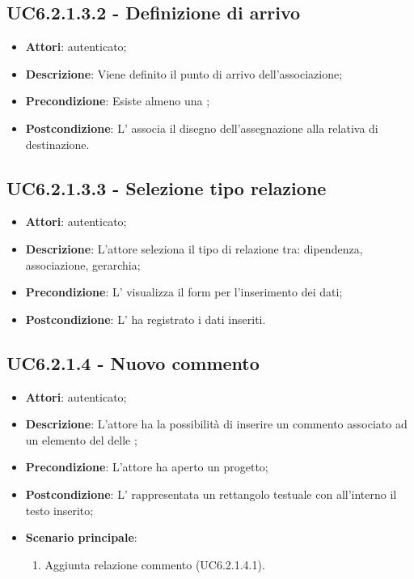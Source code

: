 \subsection{UC6.2.1.3.2 - Definizione  di arrivo}
\label{ssec:UC6.2.1.3.2}
\begin{itemize}
\item \textbf{Attori}:  autenticato;
\item \textbf{Descrizione}: Viene definito il punto di arrivo dell'associazione;
\item \textbf{Precondizione}: Esiste almeno una ;
\item \textbf{Postcondizione}: L' associa il disegno dell'assegnazione alla relativa  di destinazione.
\end{itemize}
\subsection{UC6.2.1.3.3 - Selezione tipo relazione}
\label{ssec:UC6.2.1.3.3}
\begin{itemize}
\item \textbf{Attori}:  autenticato;
\item \textbf{Descrizione}: L'attore seleziona il tipo di relazione tra: dipendenza, associazione, gerarchia;
\item \textbf{Precondizione}: L' visualizza il form per l'inserimento dei dati;
\item \textbf{Postcondizione}: L' ha registrato i dati inseriti.
\end{itemize}
\subsection{UC6.2.1.4 - Nuovo commento}
\label{ssec:UC6.2.1.4}
\begin{itemize}
\item \textbf{Attori}:  autenticato;
\item \textbf{Descrizione}: L'attore ha la possibilità di inserire un commento associato ad un elemento del  delle ;
\item \textbf{Precondizione}: L'attore ha aperto un progetto;
\item \textbf{Postcondizione}: L' rappresentata un rettangolo testuale con all'interno il testo inserito;
\item \textbf{Scenario principale}: \begin{enumerate}\item Aggiunta relazione commento (UC6.2.1.4.1).
 \end{enumerate}
\end{itemize}
